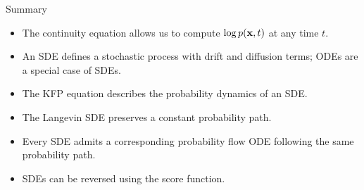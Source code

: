 \documentclass{beamer}
\begin{document}
\begin{frame}{Summary}
	\begin{itemize}
		\item The continuity equation allows us to compute $\log p(\mathbf{x}, t)$ at any time $t$.
		\vfill
		\item An SDE defines a stochastic process with drift and diffusion terms; ODEs are a special case of SDEs.
		\vfill
		\item The KFP equation describes the probability dynamics of an SDE.
		\vfill
		\item The Langevin SDE preserves a constant probability path.
		\vfill
		\item Every SDE admits a corresponding probability flow ODE following the same probability path.
		\vfill
		\item SDEs can be reversed using the score function.
	\end{itemize}
\end{frame}
\end{document}
